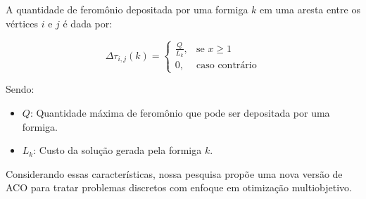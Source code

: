 A quantidade de feromônio depositada por uma formiga $k$ em uma aresta entre os vértices $i$ e $j$ é dada por:

\[ \Delta\tau_{i,j}(k) = \begin{cases} \frac{Q}{L_k},& \text{se } x\geq 1\\ 0,& \text{caso contrário} \end{cases} \]

Sendo:

\begin{itemize}  
	\item $Q$: Quantidade máxima de feromônio que pode ser depositada por uma formiga.
	\item $L_k$: Custo da solução gerada pela formiga  $k$.
\end{itemize}

Considerando essas características, nossa pesquisa propõe uma nova versão de ACO para tratar problemas discretos com enfoque em otimização multiobjetivo.
